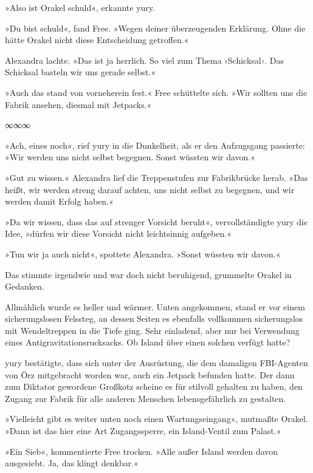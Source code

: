 »Also ist Orakel schuld«, erkannte yury.

»Du bist schuld«, fand Free. »Wegen deiner überzeugenden Erklärung. Ohne die hätte Orakel nicht diese Entscheidung getroffen.«

Alexandra lachte. »Das ist ja herrlich. So viel zum Thema ›Schicksal‹. Das Schicksal basteln wir uns gerade selbst.«

»Auch das stand von vorneherein fest.« Free schüttelte sich. »Wir sollten uns die Fabrik ansehen, diesmal mit Jetpacks.«

\begin{center}
∞∞∞
\end{center}

»Ach, eines noch«, rief yury in die Dunkelheit, als er den Aufzugsgang passierte: »Wir werden uns nicht selbst begegnen. Sonst wüssten wir davon.«

»Gut zu wissen.« Alexandra lief die Treppenstufen zur Fabrikbrücke herab. »Das heißt, wir werden streng darauf achten, uns nicht selbst zu begegnen, und wir werden damit Erfolg haben.«

»Da wir wissen, dass das auf strenger Vorsicht beruht«, vervollständigte yury die Idee, »dürfen wir diese Vorsicht nicht leichtsinnig aufgeben.«

»Tun wir ja auch nicht«, spottete Alexandra. »Sonst wüssten wir davon.«

Das stimmte irgendwie und war doch nicht beruhigend, grummelte Orakel in Gedanken.

Allmählich wurde es heller und wärmer. Unten angekommen, stand er vor einem sicherungslosen Felssteg, an dessen Seiten es ebenfalls vollkommen sicherungslos mit Wendeltreppen in die Tiefe ging. Sehr einladend, aber nur bei Verwendung eines Antigravitationsrucksacks. Ob Island über einen solchen verfügt hatte?

yury bestätigte, dass sich unter der Ausrüstung, die dem damaligen FBI-Agenten von Örz mitgebracht worden war, auch ein Jetpack befunden hatte. Der dann zum Diktator gewordene Großkotz scheine es für stilvoll gehalten zu haben, den Zugang zur Fabrik für alle anderen Menschen lebensgefährlich zu gestalten.

»Vielleicht gibt es weiter unten noch einen Wartungseingang«, mutmaßte Orakel. »Dann ist das hier eine Art Zugangssperre, ein Island-Ventil zum Palast.«

»Ein Sieb«, kommentierte Free trocken. »Alle außer Island werden davon ausgesiebt. Ja, das klingt denkbar.«

